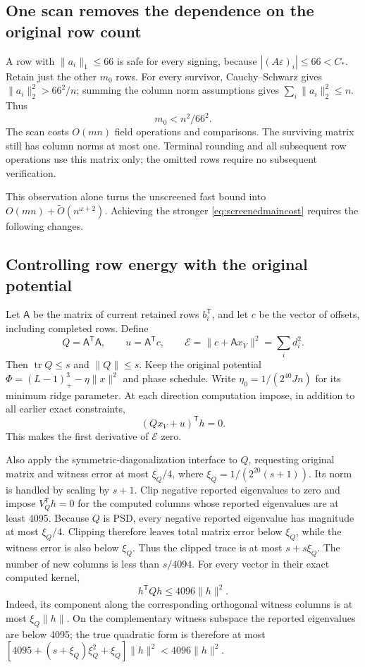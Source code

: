 \documentclass[11pt]{amsart}
\theoremstyle{remark}\newtheorem{remark}[theorem]{Remark}
\newcommand{\tr}{\operatorname{tr}}
\newcommand{\eps}{\varepsilon}
\newcommand{\T}{\mathsf T}
\begin{document}
\subsection{One scan removes the dependence on the original row count}
A row with $\|a_i\|_1\le66$ is safe for every signing, because
$|(A\eps)_i|\le66<C_*$. Retain just the other $m_0$ rows. For every
survivor, Cauchy--Schwarz gives $\|a_i\|_2^2>66^2/n$; summing the column
norm assumptions gives $\sum_i\|a_i\|_2^2\le n$. Thus
\begin{equation}\label{eq:rowpreprocess}
 m_0<n^2/66^2.
\end{equation}
The scan costs $O(mn)$ field operations and comparisons. The surviving
matrix still has column norms at most one. Terminal rounding and all
subsequent row operations use this matrix only; the omitted rows require
no subsequent verification.

This observation alone turns the unscreened fast bound into
$O(mn)+\widetilde O(n^{\omega+2})$. Achieving the stronger
\eqref{eq:screenedmaincost} requires the following changes.

\subsection{Controlling row energy with the original potential}
Let $\mathsf A$ be the matrix of current retained rows $b_i^\T$, and let
$c$ be the vector of offsets, including completed rows. Define
\[
 Q=\mathsf A^\T\mathsf A,\qquad u=\mathsf A^\T c,\qquad
 \mathcal E=\|c+\mathsf A x_V\|^2=\sum_i d_i^2.
\]
Then $\tr Q\le s$ and $\|Q\|\le s$.
Keep the original potential $\Phi=(L-1)_+^3-\eta\|x\|^2$ and phase
schedule. Write $\eta_0=1/(2^{40}Jn)$ for its minimum ridge parameter.
At each direction computation impose, in addition to all earlier exact
constraints,
\begin{equation}\label{eq:chargegradient}
 (Qx_V+u)^\T h=0.
\end{equation}
This makes the first derivative of $\mathcal E$ zero.

Also apply the symmetric-diagonalization interface to $Q$, requesting
original matrix and witness error at most $\xi_Q/4$, where
$\xi_Q=1/(2^{20}(s+1))$. Its norm is handled by scaling by $s+1$.
Clip negative reported eigenvalues to zero and impose $V_Q^\T h=0$ for
the computed columns whose reported eigenvalues are at least 4095.
Because $Q$ is PSD, every negative reported eigenvalue has magnitude at
most $\xi_Q/4$. Clipping therefore leaves total matrix error below
$\xi_Q$, while the witness error is also below $\xi_Q$. Thus the clipped trace
is at most $s+s\xi_Q$. The number of new columns is less than $s/4094$.
For every vector in their exact computed kernel,
\begin{equation}\label{eq:chargequadratic}
 h^\T Qh\le4096\|h\|^2.
\end{equation}
Indeed, its component along the corresponding orthogonal witness columns
is at most $\xi_Q\|h\|$. On the complementary witness subspace the
reported eigenvalues are below 4095; the true quadratic form is therefore
at most $[4095+(s+\xi_Q)\xi_Q^2+\xi_Q]\|h\|^2<4096\|h\|^2$.
\end{document}
